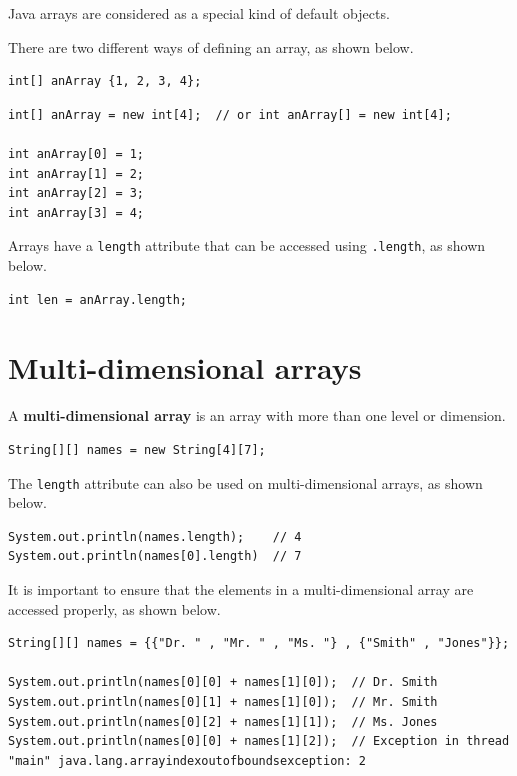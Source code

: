 \documentclass[a4paper]{systems-software}
\begin{document}
Java arrays are considered as a special kind of default objects.

There are two different ways of defining an array, as shown below.

\begin{lstlisting}[title={Defining an array in one line.}]
int[] anArray {1, 2, 3, 4};
\end{lstlisting}

\begin{lstlisting}[title={Defining an array using index values.}]
int[] anArray = new int[4];  // or int anArray[] = new int[4];

int anArray[0] = 1;
int anArray[1] = 2;
int anArray[2] = 3;
int anArray[3] = 4;
\end{lstlisting}

Arrays have a \texttt{length} attribute that can be accessed using \texttt{.length}, as shown below.

\begin{lstlisting}[title={Using the array length attribute.}]
int len = anArray.length;
\end{lstlisting}


\section*{Multi-dimensional arrays}

A \textbf{multi-dimensional array} is an array with more than one level or dimension.

\begin{lstlisting}[title={Defining a multi-dimensional.}]
String[][] names = new String[4][7];
\end{lstlisting}

The \texttt{length} attribute can also be used on multi-dimensional arrays, as shown below.

\begin{lstlisting}[title={Defining a multi-dimensional array.}]
System.out.println(names.length);    // 4
System.out.println(names[0].length)  // 7
\end{lstlisting}

It is important to ensure that the elements in a multi-dimensional array are accessed properly, as shown below.

\begin{lstlisting}[title={Accessing elements in a multi-dimensional array.}]
String[][] names = {{"Dr. " , "Mr. " , "Ms. "} , {"Smith" , "Jones"}};

System.out.println(names[0][0] + names[1][0]);  // Dr. Smith
System.out.println(names[0][1] + names[1][0]);  // Mr. Smith
System.out.println(names[0][2] + names[1][1]);  // Ms. Jones
System.out.println(names[0][0] + names[1][2]);  // Exception in thread "main" java.lang.arrayindexoutofboundsexception: 2
\end{lstlisting}
\end{document}
